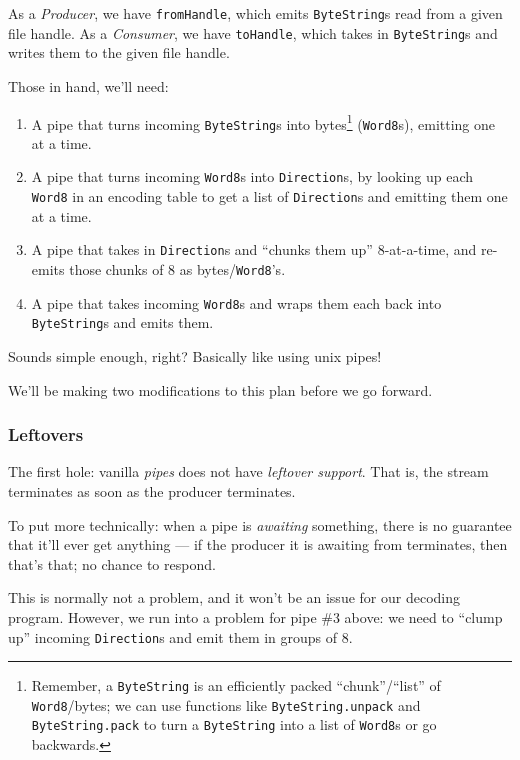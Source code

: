 \documentclass[]{article}
\begin{document}
As a \emph{Producer}, we have \texttt{fromHandle}, which emits
\texttt{ByteString}s read from a given file handle. As a
\emph{Consumer}, we have \texttt{toHandle}, which takes in
\texttt{ByteString}s and writes them to the given file handle.

Those in hand, we'll need:

\begin{enumerate}
\def\labelenumi{\arabic{enumi}.}
\tightlist
\item
  A pipe that turns incoming \texttt{ByteString}s into bytes\footnote{Remember,
    a \texttt{ByteString} is an efficiently packed ``chunk''/``list'' of
    \texttt{Word8}/bytes; we can use functions like
    \texttt{ByteString.unpack} and \texttt{ByteString.pack} to turn a
    \texttt{ByteString} into a list of \texttt{Word8}s or go backwards.}
  (\texttt{Word8}s), emitting one at a time.
\item
  A pipe that turns incoming \texttt{Word8}s into \texttt{Direction}s,
  by looking up each \texttt{Word8} in an encoding table to get a list
  of \texttt{Direction}s and emitting them one at a time.
\item
  A pipe that takes in \texttt{Direction}s and ``chunks them up''
  8-at-a-time, and re-emits those chunks of 8 as bytes/\texttt{Word8}'s.
\item
  A pipe that takes incoming \texttt{Word8}s and wraps them each back
  into \texttt{ByteString}s and emits them.
\end{enumerate}

Sounds simple enough, right? Basically like using unix pipes!

We'll be making two modifications to this plan before we go forward.

\subsubsection{Leftovers}\label{leftovers}

The first hole: vanilla \emph{pipes} does not have \emph{leftover
support}. That is, the stream terminates as soon as the producer
terminates.

To put more technically: when a pipe is \emph{awaiting} something, there
is no guarantee that it'll ever get anything --- if the producer it is
awaiting from terminates, then that's that; no chance to respond.

This is normally not a problem, and it won't be an issue for our
decoding program. However, we run into a problem for pipe \#3 above: we
need to ``clump up'' incoming \texttt{Direction}s and emit them in
groups of 8.
\end{document}
